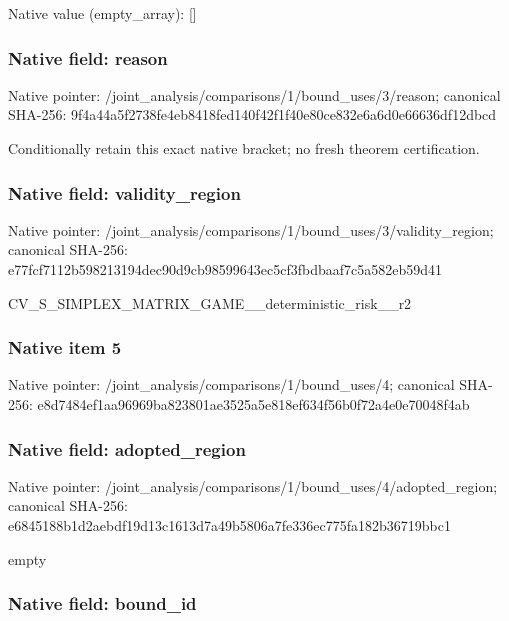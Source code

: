 \documentclass[10pt,a4paper]{article}
\begin{document}
Native value (empty\_array): []



\subsubsection{Native field: reason}


Native pointer: /joint\_analysis/comparis\allowbreak{}ons/1/bound\_uses/3/reaso\allowbreak{}n; canonical SHA-256: 9f4a44a5f2738fe4eb8418fe\allowbreak{}d140f42f1f40e80ce832e6a6\allowbreak{}d0e66636df12dbcd


Conditionally retain this exact native bracket; no fresh theorem certification.


\subsubsection{Native field: validity\_region}


Native pointer: /joint\_analysis/comparis\allowbreak{}ons/1/bound\_uses/3/valid\allowbreak{}ity\_region; canonical SHA-256: e77fcf7112b598213194dec9\allowbreak{}0d9cb98599643ec5cf3fbdba\allowbreak{}af7c5a582eb59d41


CV\_S\_SIMPLEX\_MATRIX\_GAME\allowbreak{}\_\_deterministic\_risk\_\_r2


\subsubsection{Native item 5}


Native pointer: /joint\_analysis/comparis\allowbreak{}ons/1/bound\_uses/4; canonical SHA-256: e8d7484ef1aa96969ba82380\allowbreak{}1ae3525a5e818ef634f56b0f\allowbreak{}72a4e0e70048f4ab



\subsubsection{Native field: adopted\_region}


Native pointer: /joint\_analysis/comparis\allowbreak{}ons/1/bound\_uses/4/adopt\allowbreak{}ed\_region; canonical SHA-256: e6845188b1d2aebdf19d13c1\allowbreak{}613d7a49b5806a7fe336ec77\allowbreak{}5fa182b36719bbc1


empty


\subsubsection{Native field: bound\_id}
\end{document}
